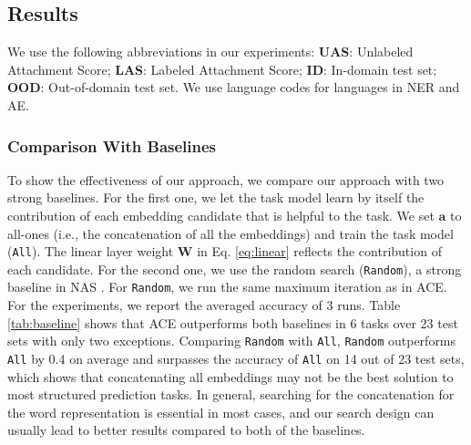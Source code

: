 \documentclass[11pt,a4paper]{article}
\def\va{{\bm{a}}}
\def\mW{{\bm{W}}}
\begin{document}
\subsection{Results}
We use the following abbreviations in our experiments: \textbf{UAS}: Unlabeled Attachment Score; \textbf{LAS}: Labeled Attachment Score; \textbf{ID}: In-domain test set; \textbf{OOD}: Out-of-domain test set. We use language codes for languages in NER and AE.

\subsubsection{Comparison With Baselines} \label{sec:exp:base}
To show the effectiveness of our approach, we compare our approach with two strong baselines. For the first one, we let the task model learn by itself the contribution of each embedding candidate that is helpful to the task. We set $\va$ to all-ones (i.e., the concatenation of all the embeddings) and train the task model ({\tt All}). The linear layer weight $\mW$ in Eq. \ref{eq:linear} reflects the contribution of each candidate. For the second one, we use the random search ({\tt Random}), a strong baseline in NAS \citep{li2020random}. For {\tt Random}, we run the same maximum iteration as in ACE. For the experiments, we report the averaged accuracy of 3 runs. Table \ref{tab:baseline} shows that ACE outperforms both baselines in 6 tasks over 23 test sets with only two exceptions. Comparing {\tt Random} with {\tt All}, {\tt Random} outperforms {\tt All} by 0.4 on average and surpasses the accuracy of {\tt All} on 14 out of 23 test sets, which shows that concatenating all embeddings may not be the best solution to most structured prediction tasks. 
In general, searching for the concatenation for the word representation is essential in most cases, and our search design can usually lead to better results compared to both of the baselines.
\end{document}
